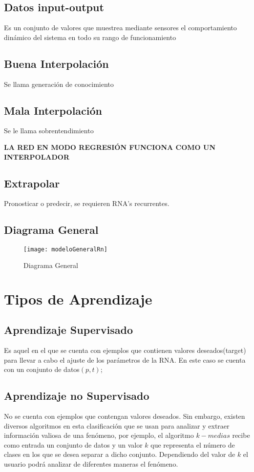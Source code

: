 \documentclass{article}
\begin{document}
\subsection{Datos input-output}
Es un conjunto de valores que muestrea mediante sensores el comportamiento dinámico del sistema en todo su rango de funcionamiento

\subsection{Buena Interpolación}
Se llama generación de conocimiento

\subsection{Mala Interpolación}
Se le llama sobrentendimiento

\textbf{LA RED EN MODO REGRESIÓN FUNCIONA COMO UN INTERPOLADOR}

\subsection{Extrapolar}
Pronosticar o predecir, se requieren RNA's recurrentes.

\subsection{Diagrama General}
\begin{figure}[h]
	\caption{Diagrama General}
	\texttt{[image: modeloGeneralRn]}
\end{figure}

\section{Tipos de Aprendizaje}
\subsection{Aprendizaje Supervisado}
Es aquel en el que se cuenta con ejemplos que contienen valores deseados(target) para llevar a cabo el ajuste de los parámetros de la RNA. En este caso se cuenta con un conjunto de datos$(p, t)$;

\subsection{Aprendizaje no Supervisado}
No se cuenta con ejemplos que contengan valores deseados. Sin embargo, existen diversos algoritmos en esta clasificación que se usan para analizar y extraer información valiosa de una fenómeno, por ejemplo, el algoritmo $k-medias$ recibe como entrada un conjunto de datos y un valor $k$ que representa el número de clases en los que se desea separar a dicho conjunto. Dependiendo del valor de $k$ el usuario podrá analizar de diferentes maneras el fenómeno.
\end{document}
